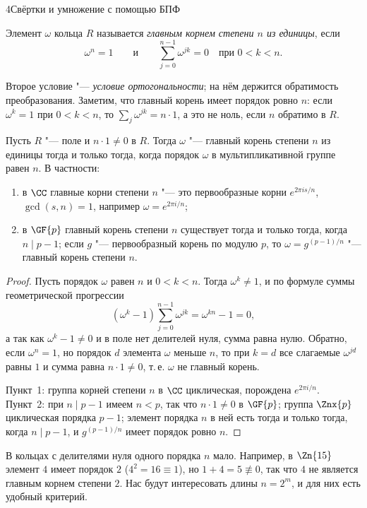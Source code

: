 \begin{lecture}{4}{Свёртки и умножение с помощью БПФ}
\begin{definition}\label{l4:principal}
Элемент $\omega$ кольца $R$ называется \emph{главным корнем степени $n$ из единицы}, если
\[
  \omega^n = 1 \qquad\text{и}\qquad \sum_{j=0}^{n-1} \omega^{jk} = 0 \quad\text{при } 0 < k < n.
\]
\end{definition}

Второе условие "--- \emph{условие ортогональности}; на нём держится обратимость преобразования.
Заметим, что главный корень имеет порядок ровно $n$: если $\omega^k = 1$ при $0 < k < n$, то
$\sum_j \omega^{jk} = n \cdot 1$, а это не ноль, если $n$ обратимо в $R$.

\begin{proposition}\label{l4:field}
Пусть $R$ "--- поле и $n \cdot 1 \ne 0$ в $R$. Тогда $\omega$ "--- главный корень
степени $n$ из единицы тогда и только тогда, когда порядок $\omega$ в мультипликативной группе
равен $n$. В частности:
\begin{enumerate}
  \item в $\CC$ главные корни степени $n$ "--- это первообразные корни $e^{2\pi i s/n}$,
    $\gcd(s, n) = 1$, например $\omega = e^{2\pi i/n}$;
  \item в $\GF{p}$ главный корень степени $n$ существует тогда и только тогда, когда
    $n \mid p - 1$; если $g$ "--- первообразный корень по модулю $p$, то
    $\omega = g^{(p-1)/n}$ "--- главный корень степени $n$.
\end{enumerate}
\end{proposition}

\begin{proof}
Пусть порядок $\omega$ равен $n$ и $0 < k < n$. Тогда $\omega^k \ne 1$, и по формуле суммы
геометрической прогрессии
\[
  (\omega^k - 1) \sum_{j=0}^{n-1} \omega^{jk} = \omega^{kn} - 1 = 0,
\]
а так как $\omega^k - 1 \ne 0$ и в поле нет делителей нуля, сумма равна нулю. Обратно, если
$\omega^n = 1$, но порядок $d$ элемента $\omega$ меньше $n$, то при $k = d$ все слагаемые
$\omega^{jd}$ равны $1$ и сумма равна $n \cdot 1 \ne 0$, т.\,е. $\omega$ не главный корень.

Пункт~1: группа корней степени $n$ в $\CC$ циклическая, порождена $e^{2\pi i/n}$.
Пункт~2: при $n \mid p - 1$ имеем $n < p$, так что $n \cdot 1 \ne 0$ в $\GF{p}$; группа $\Znx{p}$ циклическая порядка $p - 1$; элемент порядка $n$ в ней есть тогда и
только тогда, когда $n \mid p - 1$, и $g^{(p-1)/n}$ имеет порядок ровно $n$.
\end{proof}

В кольцах с делителями нуля одного порядка $n$ мало. Например, в $\Zn{15}$ элемент $4$ имеет
порядок $2$ ($4^2 = 16 \equiv 1$), но $1 + 4 = 5 \not\equiv 0$, так что $4$ не является главным
корнем степени $2$. Нас будут интересовать длины $n = 2^m$, и для них есть удобный критерий.


\end{lecture}
